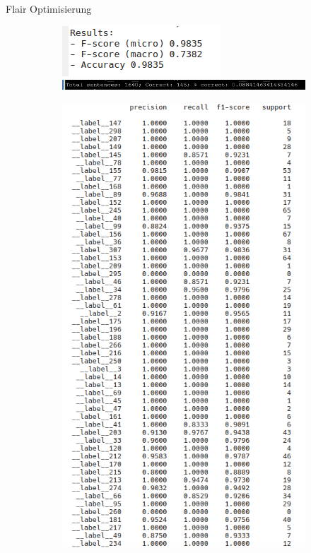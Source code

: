 \documentclass[xcolor=table]{beamer}
\begin{document}
\begin{frame}[t]{Flair Optimisierung}\vspace{10pt}
\begin{figure}
	\begin{subfigure}{.4\textwidth}
		\includegraphics[scale=.3]{flair_results_training1.png}
		\includegraphics[scale=.3]{flair_acc_opt.png}
	\end{subfigure}%
	\begin{subfigure}{.3\textwidth}
		\includegraphics[scale=.25]{flair_results_by_class.png}

\end{subfigure}
\end{figure}
\end{frame}
\end{document}
